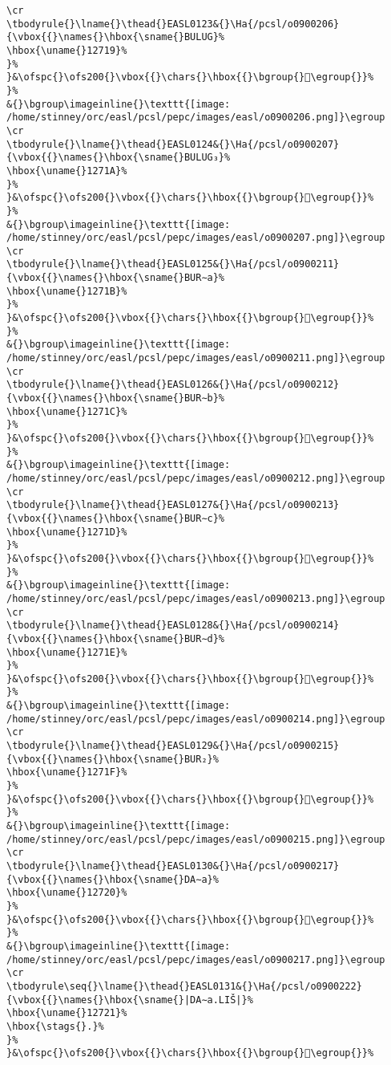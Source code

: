 \begin{verbatim}
\cr
\tbodyrule{}\lname{}\thead{}EASL0123&{}\Ha{/pcsl/o0900206}{\vbox{{}\names{}\hbox{\sname{}BULUG}%
\hbox{\uname{}12719}%
}%
}&\ofspc{}\ofs200{}\vbox{{}\chars{}\hbox{{}\bgroup{}𒜙\egroup{}}%
}%
&{}\bgroup\imageinline{}\texttt{[image: /home/stinney/orc/easl/pcsl/pepc/images/easl/o0900206.png]}\egroup
\cr
\tbodyrule{}\lname{}\thead{}EASL0124&{}\Ha{/pcsl/o0900207}{\vbox{{}\names{}\hbox{\sname{}BULUG₃}%
\hbox{\uname{}1271A}%
}%
}&\ofspc{}\ofs200{}\vbox{{}\chars{}\hbox{{}\bgroup{}𒜚\egroup{}}%
}%
&{}\bgroup\imageinline{}\texttt{[image: /home/stinney/orc/easl/pcsl/pepc/images/easl/o0900207.png]}\egroup
\cr
\tbodyrule{}\lname{}\thead{}EASL0125&{}\Ha{/pcsl/o0900211}{\vbox{{}\names{}\hbox{\sname{}BUR∼a}%
\hbox{\uname{}1271B}%
}%
}&\ofspc{}\ofs200{}\vbox{{}\chars{}\hbox{{}\bgroup{}𒜛\egroup{}}%
}%
&{}\bgroup\imageinline{}\texttt{[image: /home/stinney/orc/easl/pcsl/pepc/images/easl/o0900211.png]}\egroup
\cr
\tbodyrule{}\lname{}\thead{}EASL0126&{}\Ha{/pcsl/o0900212}{\vbox{{}\names{}\hbox{\sname{}BUR∼b}%
\hbox{\uname{}1271C}%
}%
}&\ofspc{}\ofs200{}\vbox{{}\chars{}\hbox{{}\bgroup{}𒜜\egroup{}}%
}%
&{}\bgroup\imageinline{}\texttt{[image: /home/stinney/orc/easl/pcsl/pepc/images/easl/o0900212.png]}\egroup
\cr
\tbodyrule{}\lname{}\thead{}EASL0127&{}\Ha{/pcsl/o0900213}{\vbox{{}\names{}\hbox{\sname{}BUR∼c}%
\hbox{\uname{}1271D}%
}%
}&\ofspc{}\ofs200{}\vbox{{}\chars{}\hbox{{}\bgroup{}𒜝\egroup{}}%
}%
&{}\bgroup\imageinline{}\texttt{[image: /home/stinney/orc/easl/pcsl/pepc/images/easl/o0900213.png]}\egroup
\cr
\tbodyrule{}\lname{}\thead{}EASL0128&{}\Ha{/pcsl/o0900214}{\vbox{{}\names{}\hbox{\sname{}BUR∼d}%
\hbox{\uname{}1271E}%
}%
}&\ofspc{}\ofs200{}\vbox{{}\chars{}\hbox{{}\bgroup{}𒜞\egroup{}}%
}%
&{}\bgroup\imageinline{}\texttt{[image: /home/stinney/orc/easl/pcsl/pepc/images/easl/o0900214.png]}\egroup
\cr
\tbodyrule{}\lname{}\thead{}EASL0129&{}\Ha{/pcsl/o0900215}{\vbox{{}\names{}\hbox{\sname{}BUR₂}%
\hbox{\uname{}1271F}%
}%
}&\ofspc{}\ofs200{}\vbox{{}\chars{}\hbox{{}\bgroup{}𒜟\egroup{}}%
}%
&{}\bgroup\imageinline{}\texttt{[image: /home/stinney/orc/easl/pcsl/pepc/images/easl/o0900215.png]}\egroup
\cr
\tbodyrule{}\lname{}\thead{}EASL0130&{}\Ha{/pcsl/o0900217}{\vbox{{}\names{}\hbox{\sname{}DA∼a}%
\hbox{\uname{}12720}%
}%
}&\ofspc{}\ofs200{}\vbox{{}\chars{}\hbox{{}\bgroup{}𒜠\egroup{}}%
}%
&{}\bgroup\imageinline{}\texttt{[image: /home/stinney/orc/easl/pcsl/pepc/images/easl/o0900217.png]}\egroup
\cr
\tbodyrule\seq{}\lname{}\thead{}EASL0131&{}\Ha{/pcsl/o0900222}{\vbox{{}\names{}\hbox{\sname{}|DA∼a.LIŠ|}%
\hbox{\uname{}12721}%
\hbox{\stags{}.}%
}%
}&\ofspc{}\ofs200{}\vbox{{}\chars{}\hbox{{}\bgroup{}𒜡\egroup{}}%

\end{verbatim}
